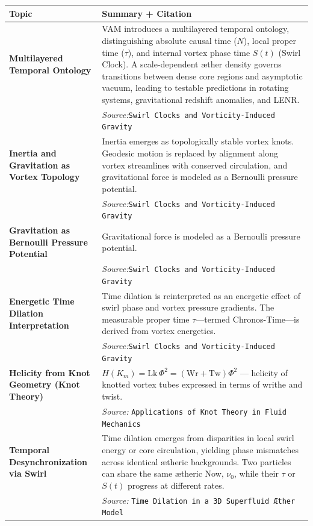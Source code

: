 \documentclass[11pt]{article}
\begin{document}
\begin{table}[H]
\centering
\begin{tabular}{|p{4.3cm}|p{9.5cm}|}
\hline
\textbf{Topic} & \textbf{Summary + Citation} \\
\hline
\textbf{Multilayered Temporal Ontology} &
VAM introduces a multilayered temporal ontology, distinguishing absolute causal time ($N$), local proper time ($\tau$), and internal vortex phase time $S(t)$ (Swirl Clock). A scale-dependent æther density governs transitions between dense core regions and asymptotic vacuum, leading to testable predictions in rotating systems, gravitational redshift anomalies, and LENR.\\
& \textit{Source:}\texttt{Swirl Clocks and Vorticity-Induced Gravity}\\
\hline

\textbf{Inertia and Gravitation as Vortex Topology} &
Inertia emerges as topologically stable vortex knots. Geodesic motion is replaced by alignment along vortex streamlines with conserved circulation, and gravitational force is modeled as a Bernoulli pressure potential.\\
& \textit{Source:}\texttt{Swirl Clocks and Vorticity-Induced Gravity}\\
\hline

\textbf{Gravitation as Bernoulli Pressure Potential} &
Gravitational force is modeled as a Bernoulli pressure potential.\\
& \textit{Source:}\texttt{Swirl Clocks and Vorticity-Induced Gravity}\\
\hline

\textbf{Energetic Time Dilation Interpretation} &
Time dilation is reinterpreted as an energetic effect of swirl phase and vortex pressure gradients. The measurable proper time $\tau$—termed Chronos-Time—is derived from vortex energetics.\\
& \textit{Source:}\texttt{Swirl Clocks and Vorticity-Induced Gravity}\\
\hline

\textbf{Helicity from Knot Geometry (Knot Theory)} &
$H(K_m) = \text{Lk} \, \Phi^2 = (\text{Wr} + \text{Tw}) \Phi^2$ — helicity of knotted vortex tubes expressed in terms of writhe and twist.\\
& \textit{Source:}  \texttt{Applications of Knot Theory in Fluid Mechanics} \\
\hline

\textbf{Temporal Desynchronization via Swirl} &
Time dilation emerges from disparities in local swirl energy or core circulation, yielding phase mismatches across identical ætheric backgrounds. Two particles can share the same ætheric Now, $\nu_0$, while their $\tau$ or $S(t)$ progress at different rates.\\
& \textit{Source:}  \texttt{Time Dilation in a 3D Superfluid Æther Model}\\
\hline


\end{tabular}
\end{table}
\end{document}
